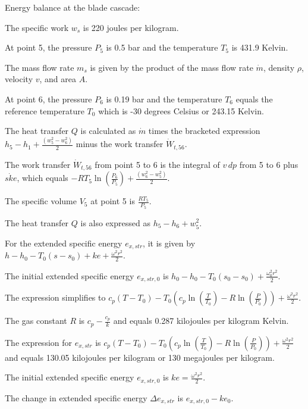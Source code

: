 Energy balance at the blade cascade:

The specific work \( w_s \) is 220 joules per kilogram.

At point 5, the pressure \( P_5 \) is 0.5 bar and the temperature \( T_5 \) is 431.9 Kelvin.

The mass flow rate \( m_s \) is given by the product of the mass flow rate \( \dot{m} \), density \( \rho \), velocity \( v \), and area \( A \).

At point 6, the pressure \( P_6 \) is 0.19 bar and the temperature \( T_6 \) equals the reference temperature \( T_0 \) which is -30 degrees Celsius or 243.15 Kelvin.

The heat transfer \( Q \) is calculated as \( \dot{m} \) times the bracketed expression \( h_5 - h_1 + \frac{(w_5^2 - w_6^2)}{2} \) minus the work transfer \( \dot{W}_{t,56} \).

The work transfer \( \dot{W}_{t,56} \) from point 5 to 6 is the integral of \( v \, dp \) from 5 to 6 plus \( \dot{ske} \), which equals \(-RT_5 \ln \left( \frac{P_6}{P_5} \right) + \frac{(w_6^2 - w_5^2)}{2}\).

The specific volume \( V_5 \) at point 5 is \( \frac{RT_5}{P_5} \).

The heat transfer \( Q \) is also expressed as \( h_5 - h_6 + w_5^2 \).

For the extended specific energy \( e_{x,str} \), it is given by \( h - h_0 - T_0(s - s_0) + ke + \frac{\omega^2 r^2}{2} \).

The initial extended specific energy \( e_{x,str,0} \) is \( h_0 - h_0 - T_0(s_0 - s_0) + \frac{\omega_0^2 r^2}{2} \).

The expression simplifies to \( c_p (T - T_0) - T_0 \left( c_p \ln \left( \frac{T}{T_0} \right) - R \ln \left( \frac{P}{P_0} \right) \right) + \frac{\omega^2 r^2}{2} \).

The gas constant \( R \) is \( c_p - \frac{c_p}{k} \) and equals 0.287 kilojoules per kilogram Kelvin.

The expression for \( e_{x,str} \) is \( c_p \left( T - T_0 \right) - T_0 \left( c_p \ln \left( \frac{T}{T_0} \right) - R \ln \left( \frac{P}{P_0} \right) \right) + \frac{\omega^2 r^2}{2} \) and equals 130.05 kilojoules per kilogram or 130 megajoules per kilogram.

The initial extended specific energy \( e_{x,str,0} \) is \( ke = \frac{\omega^2 r^2}{2} \).

The change in extended specific energy \( \Delta e_{x,str} \) is \( e_{x,str,0} - ke_0 \).